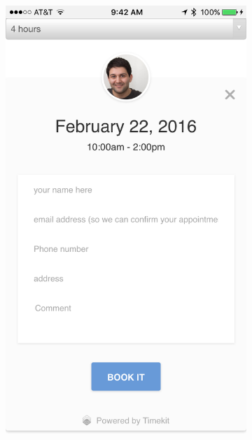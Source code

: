 \documentclass[11pt]{article}
\begin{document}
\begin{figure}
\begin{subfigure}[b]{0.3\textwidth}
        \includegraphics[width=\textwidth]{figures/2.png}
        \label{fig:confirm}
    \end{subfigure}
    ~ %
    \begin{subfigure}[b]{0.3\textwidth}

\end{subfigure}
\end{figure}
\end{document}
